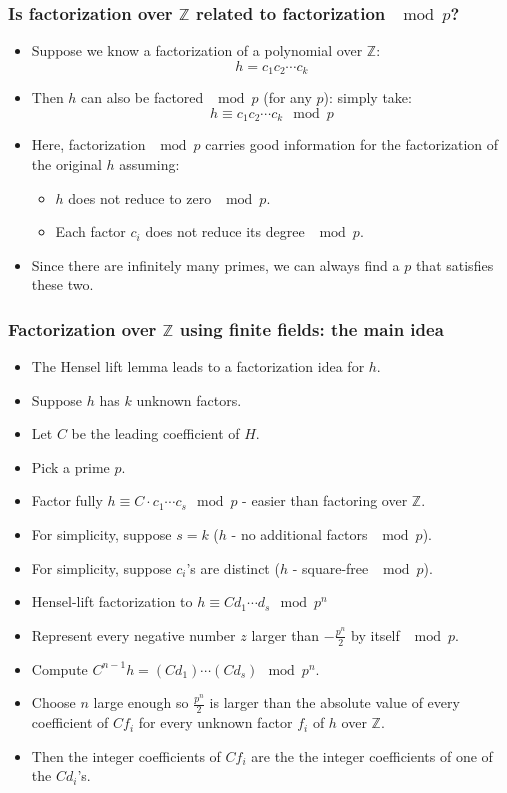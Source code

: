 \begin{frame}
\frametitle{Is factorization over $\mathbb Z$ related to factorization $\mod p$?}
\begin{itemize}
\item<1-> Suppose we know a factorization of a polynomial over $\mathbb Z$:
\[
h=c_1c_2\cdots c_k
\]
\item<2-> Then $h$ can also be factored $\mod p$ (for any $p$): simply take:
\[
h\equiv c_1c_2\cdots c_k \mod p
\]
\item<3-> Here, factorization $\mod p$ carries good information for the factorization of the original $h$ assuming:
\begin{itemize}
\item<4-> $h$ does not reduce to zero $\mod p$.
\item<5-> Each factor $c_i$ does not reduce its degree $\mod p$.
\end{itemize}
\item<6-> Since there are infinitely many primes, we can always find a $p$ that satisfies these two.
\end{itemize}
\end{frame}

\begin{frame}
\frametitle{Factorization over $\mathbb Z$ using finite fields: the main idea}
\begin{itemize}
\item The Hensel lift lemma leads to a factorization idea for $h$.
\item<2-> Suppose $h$ has $k$ unknown factors. 
\item<3-> Let $C$ be the leading coefficient of $H$.
\item<4-> Pick a prime $p$.
\item<5-> Factor fully $h \equiv C\cdot c_1\cdots c_s \mod p$ - easier than factoring over $\mathbb Z$.
\item<6-> For simplicity, suppose $s=k$ ($h$ - no additional factors $\mod p$).
\item<7-> For simplicity, suppose $c_i$'s are distinct ($h$ - square-free $\mod p$).
\item<8-> Hensel-lift factorization to $h \equiv C d_1\cdots d_s \mod p^n$
\item<9-> Represent every negative number $z$ larger than $-\frac{p^n}{2}$ by itself $\mod p$.
\item<10-> Compute $C^{n-1}h= \left(Cd_1\right)\cdots\left(Cd_s\right) \mod p^n$.
\item<11-> Choose $n$ large enough so $\frac{p^n}{2}$ is larger than the absolute value of every coefficient of $C f_i$ for every unknown factor $f_i$ of $h$ over $\mathbb Z$.
\item<12-> Then the integer coefficients of $C f_i$ are the the integer coefficients of one of the $Cd_i$'s.
\end{itemize}
\end{frame}


